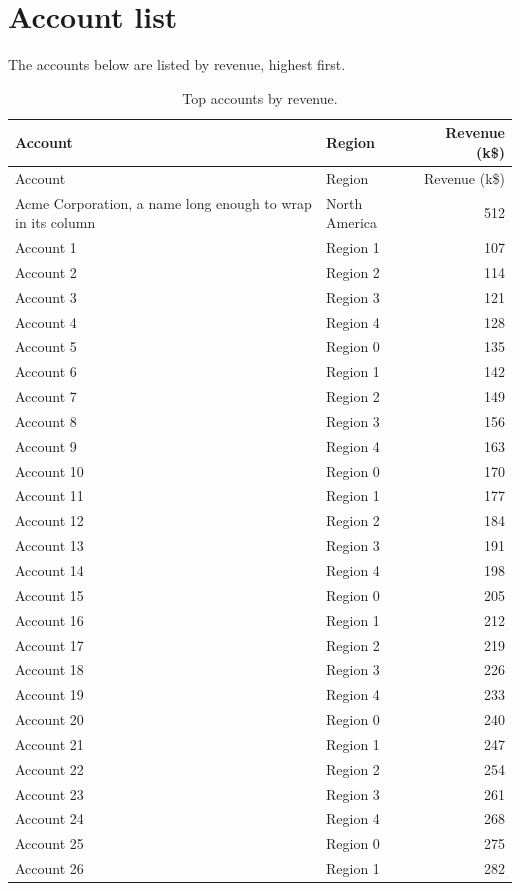 \documentclass[11pt,a4paper]{article}
\begin{document}
\section{Account list}
The accounts below are listed by revenue, highest first.

\begin{longtable}{p{4cm} l r}
\caption{Top accounts by revenue.}\\
\toprule
Account & Region & Revenue (k\$) \\
\midrule
\endfirsthead
\toprule
Account & Region & Revenue (k\$) \\
\midrule
\endhead
\bottomrule
\endfoot
Acme Corporation, a name long enough to wrap in its column & North America & 512 \\
\midrule
Account 1 & Region 1 & 107 \\
Account 2 & Region 2 & 114 \\
Account 3 & Region 3 & 121 \\
Account 4 & Region 4 & 128 \\
Account 5 & Region 0 & 135 \\
Account 6 & Region 1 & 142 \\
Account 7 & Region 2 & 149 \\
Account 8 & Region 3 & 156 \\
Account 9 & Region 4 & 163 \\
Account 10 & Region 0 & 170 \\
Account 11 & Region 1 & 177 \\
Account 12 & Region 2 & 184 \\
Account 13 & Region 3 & 191 \\
Account 14 & Region 4 & 198 \\
Account 15 & Region 0 & 205 \\
Account 16 & Region 1 & 212 \\
Account 17 & Region 2 & 219 \\
Account 18 & Region 3 & 226 \\
Account 19 & Region 4 & 233 \\
Account 20 & Region 0 & 240 \\
Account 21 & Region 1 & 247 \\
Account 22 & Region 2 & 254 \\
Account 23 & Region 3 & 261 \\
Account 24 & Region 4 & 268 \\
Account 25 & Region 0 & 275 \\
Account 26 & Region 1 & 282 \\

\end{longtable}
\end{document}
